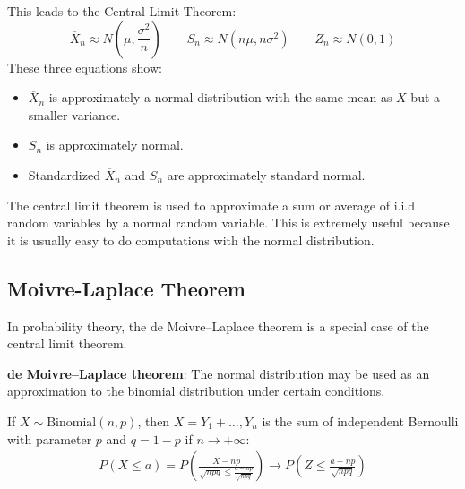 \documentclass[10pt,a4paper]{article}
\begin{document}
This leads to the Central Limit Theorem:
\begin{equation*}
	\overline{X}_n \approx N(\mu, \frac{\sigma^2}{n}) \qquad S_n \approx N(n\mu,n\sigma^2) \qquad Z_n \approx N(0,1)
\end{equation*}
These three equations show:
\begin{itemize}
	\item $\overline{X}_n$ is approximately a normal distribution with the same mean as $X$	but a smaller variance.
	\item $S_n$ is approximately normal.
	\item Standardized $\overline{X}_n$ and $S_n$ are approximately standard normal.
\end{itemize}

The central limit theorem is used to approximate a sum or average of i.i.d random variables by a
normal random variable. This is extremely useful because it is usually easy to do computations with
the normal distribution.

\subsection{Moivre-Laplace Theorem}

In probability theory, the de Moivre–Laplace theorem is a special case of the central limit theorem.

\begin{tcolorbox}[breakable,colback=white]
\textbf{de Moivre–Laplace theorem}: The normal distribution may be used as an approximation to the binomial distribution under certain conditions.
\end{tcolorbox}

If $X\sim \text{Binomial}(n,p)$, then $X=Y_1+\dots,Y_n$ is the sum of independent Bernoulli with
parameter $p$ and $q=1-p$ if $n\rightarrow +\infty$:
\begin{align*}
	P(X\leq a) = P\left(\frac{X-np}{\sqrt{npq}\leq \frac{a-np}{\sqrt{npq}}}\right)\rightarrow P\left(Z \leq \frac{a-np}{\sqrt{npq}}\right)
\end{align*}

\end{document}
